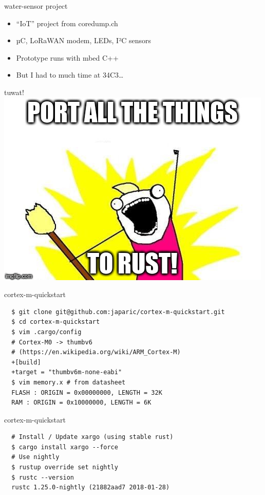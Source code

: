 \documentclass[aspectratio=1610,14pt,t]{beamer}
\begin{document}
\begin{frame}[c]{water-sensor project}
  \begin{itemize}
    \item ``IoT'' project from coredump.ch
    \item µC, LoRaWAN modem, LEDs, I²C sensors
    \item Prototype runs with mbed C++
    \item<2-> But I had to much time at 34C3\ldots
  \end{itemize}
\end{frame}

\begin{frame}[c]{tuwat!}
  \centering
  \includegraphics[width=.8\textwidth]{img/port-all-the-things.jpg}
\end{frame}

\begin{frame}[c,fragile]{cortex-m-quickstart}
  \begin{verbatim}
  $ git clone git@github.com:japaric/cortex-m-quickstart.git
  $ cd cortex-m-quickstart
  $ vim .cargo/config
  # Cortex-M0 -> thumbv6
  # (https://en.wikipedia.org/wiki/ARM_Cortex-M)
  +[build]
  +target = "thumbv6m-none-eabi"
  $ vim memory.x # from datasheet
  FLASH : ORIGIN = 0x00000000, LENGTH = 32K
  RAM : ORIGIN = 0x10000000, LENGTH = 6K
  \end{verbatim}
\end{frame}

\begin{frame}[c,fragile]{cortex-m-quickstart}
  \begin{verbatim}
  # Install / Update xargo (using stable rust)
  $ cargo install xargo --force
  # Use nightly
  $ rustup override set nightly
  $ rustc --version
  rustc 1.25.0-nightly (21882aad7 2018-01-28)
  \end{verbatim}
\end{frame}
\end{document}
